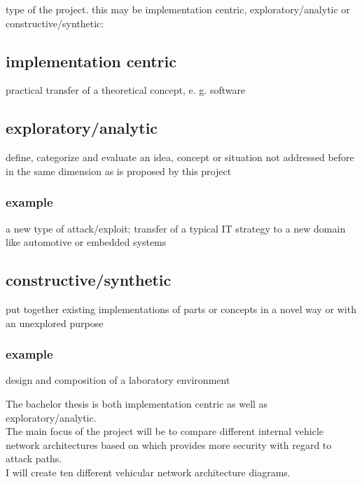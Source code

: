 \begin{shaded}
\noindent
type of the project. this may be implementation centric, exploratory/analytic or constructive/synthetic:

\subsection{implementation centric}
practical transfer of a theoretical concept, e. g. software

\bigskip
\subsection{exploratory/analytic}
define, categorize and evaluate an idea, concept or situation not addressed before in the same dimension as is proposed by this project
\subsubsection{example}
a new type of attack/exploit; transfer of a typical IT strategy to a new domain like automotive or embedded systems

\bigskip
\subsection {constructive/synthetic}
put together existing implementations of parts or concepts in a novel way or with an unexplored purpose
\subsubsection{example}
design and composition of a laboratory environment

\end{shaded}

\vfill

The bachelor thesis is both implementation centric as well as exploratory/analytic.\\

The main focus of the project will be to compare different internal vehicle network architectures based on which provides more security with regard to attack paths.\\

I will create ten different vehicular network architecture diagrams.\\
